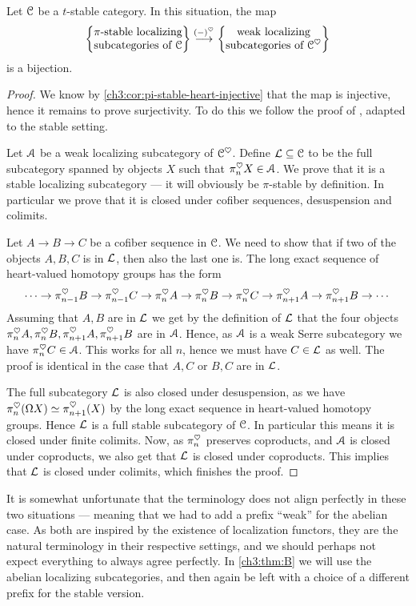 \begin{theorem}
    \label{ch3:thm:premain}
    Let $\EuScript{C}$ be a $t$-stable category. In this situation, the map 
    \[\left\{ \begin{matrix} \pi\text{-stable localizing}\\ \text{subcategories of }\EuScript{C} \end{matrix} \right\}\overset{(-)^\heartsuit}{\longrightarrow} \left\{ \begin{matrix} \text{weak localizing}\\ \text{subcategories of }\EuScript{C}^\heartsuit \end{matrix} \right\}\] 
    is a bijection. 
\end{theorem}
\begin{proof}
    We know by \cref{ch3:cor:pi-stable-heart-injective} that the map is injective, hence it remains to prove surjectivity. To do this we follow the proof of \cite[C.5.2.7]{lurie_SAG}, adapted to the stable setting. 
    
    Let $\EuScript{A}$ be a weak localizing subcategory of $\EuScript{C}^\heartsuit$. Define $\mathcal{L}\subseteq \EuScript{C}$ to be the full subcategory spanned by objects $X$ such that $\pi_n^\heartsuit X\in \EuScript{A}$. We prove that it is a stable localizing subcategory --- it will obviously be $\pi$-stable by definition. In particular we prove that it is closed under cofiber sequences, desuspension and colimits. 

    Let $A\rightarrow B\rightarrow C$ be a cofiber sequence in $\EuScript{C}$. We need to show that if two of the objects $A, B, C$ is in $\mathcal{L}$, then also the last one is. The long exact sequence of heart-valued homotopy groups has the form 
    \[\cdots\rightarrow \pi^{\heartsuit}_{n-1}B \rightarrow \pi^{\heartsuit}_{n-1}C \rightarrow \pi^{\heartsuit}_{n}A \rightarrow \pi^{\heartsuit}_{n}B \rightarrow \pi^{\heartsuit}_{n}C \rightarrow \pi^{\heartsuit}_{n+1}A\rightarrow \pi^{\heartsuit}_{n+1}B \rightarrow \cdots \]
    Assuming that $A, B$ are in $\mathcal{L}$ we get by the definition of $\mathcal{L}$ that the four objects $\pi^{\heartsuit}_{n}A, \pi^{\heartsuit}_{n}B, \pi^{\heartsuit}_{n+1}A, \pi^{\heartsuit}_{n+1}B$ are in $\EuScript{A}$. Hence, as $\EuScript{A}$ is a weak Serre subcategory we have $\pi^\heartsuit_n C\in \EuScript{A}$. This works for all $n$, hence we must have $C\in \mathcal{L}$ as well. The proof is identical in the case that $A, C$ or $B, C$ are in $\mathcal{L}$. 
    
    The full subcategory $\mathcal{L}$ is also closed under desuspension, as we have $\pi_n^\heartsuit (\Omega X)\simeq \pi_{n+1}^\heartsuit(X)$ by the long exact sequence in heart-valued homotopy groups. Hence $\mathcal{L}$ is a full stable subcategory of $\EuScript{C}$. In particular this means it is closed under finite colimits. Now, as $\pi_n^\heartsuit$ preserves coproducts, and $\EuScript{A}$ is closed under coproducts, we also get that $\mathcal{L}$ is closed under coproducts. This implies that $\mathcal{L}$ is closed under colimits, which finishes the proof. 
\end{proof}

\begin{remark}
    It is somewhat unfortunate that the terminology does not align perfectly in these two situations --- meaning that we had to add a prefix ``weak'' for the abelian case. As both are inspired by the existence of localization functors, they are the natural terminology in their respective settings, and we should perhaps not expect everything to always agree perfectly. In \cref{ch3:thm:B} we will use the abelian localizing subcategories, and then again be left with a choice of a different prefix for the stable version. 
\end{remark}


